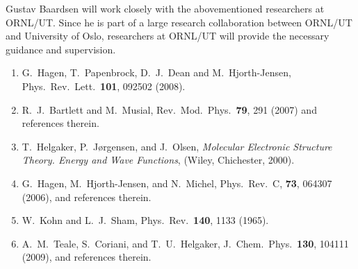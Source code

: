 \documentclass[12pt,titlepage]{article}
\begin{document}
Gustav Baardsen will work closely with the abovementioned researchers at
ORNL/UT. Since he is
part of a large research collaboration between ORNL/UT and University of
Oslo, researchers at ORNL/UT 
will provide the necessary guidance and supervision.


\begin{enumerate}
\item G.~Hagen, T.~Papenbrock, D.~J.~Dean and M.~Hjorth-Jensen, \\
  Phys.~Rev.~Lett.~{\bf 101}, 092502 (2008).
\item R.~J.~Bartlett and M.~Musial, Rev.~Mod.~Phys.~{\bf 79}, 291 (2007) and references therein.
\item T.~Helgaker, P.~J{\o}rgensen, and J.~Olsen, {\em Molecular Electronic Structure Theory. Energy and Wave
  Functions}, (Wiley, Chichester, 2000).
\item G.~Hagen, M.~Hjorth-Jensen, and N.~Michel, Phys.~Rev.~C, {\bf 73}, 064307 (2006), and references therein.
\item W.~Kohn and L.~J.~Sham, Phys.~Rev.~{\bf 140}, 1133 (1965).
\item  A.~M.~Teale, S.~Coriani, and T.~U.~Helgaker, J.~Chem.~Phys.~{\bf 130}, 104111 (2009), and references therein.

\end{enumerate}
\end{document}

